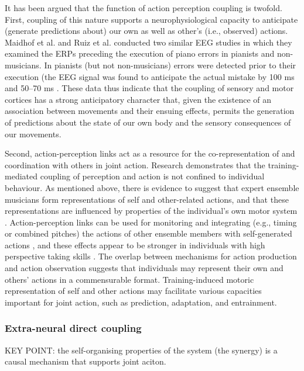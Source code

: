 \begin{CJK}{UTF8}{gbsn}
It has been argued that the function of action perception coupling is twofold.  First, coupling of this nature supports a neurophysiological capacity to anticipate (generate predictions about) our own as well as other's  (i.e., observed) actions.  Maidhof et al. \textcite{Maidhof2009} and Ruiz et al. \textcite{Ruiz2009} conducted two similar EEG studies in which they examined the ERPs preceding the execution of piano errors in pianists and non-musicians.  In pianists (but not non-musicians) errors were detected prior to their execution (the EEG signal was found to anticipate the actual mistake by 100 ms \citep{Maidhof2009} and 50–70 ms \citep{Ruiz009}.  These data thus indicate that the coupling of sensory and motor cortices has a strong anticipatory character that, given the existence of an association between movements and their ensuing effects, permits the generation of predictions about the state of our own body and the sensory consequences of our movements.

Second, action-perception links act as a resource for the co-representation of and coordination with others in joint action.
Research demonstrates that the training-mediated coupling of perception and action is not confined to individual behaviour.  As mentioned above, there is evidence to suggest that expert ensemble musicians form representations of self and other-related actions, and that these representations are influenced by properties of the individual’s own motor system \citep{Novembre2012}.  Action-perception links can be used for monitoring and integrating (e.g., timing or combined pitches) the actions of other ensemble members with self-generated actions \citep{Loehr2013}, and these effects appear to be stronger in individuals with high perspective taking skills \citep{Novembre2012,Loehr2013}.  The overlap between mechanisms for action production and action observation suggests that individuals may represent their own and others’ actions in a commensurable format.  Training-induced motoric representation of self and other actions may facilitate various capacities important for joint action, such as prediction, adaptation, and entrainment.


\subsubsection{Extra-neural direct coupling}

KEY POINT: the self-organising properties of the system (the synergy) is a causal mechanism that supports joint aciton.


\end{CJK}
